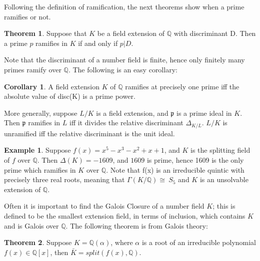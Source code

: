 \documentclass[12pt]{extarticle}
\newcommand{\Q}{\mathbb{Q}}
\newcommand{\GG}{\Gamma(K/\mathbb{Q})}
\newcommand{\spl}{split(f(x),\mathbb{Q})}
\newcommand{\<}{\langle}
\renewcommand{\>}{\rangle}
\theoremstyle{definition}
\newtheorem{theorem}{Theorem}
\newtheorem{corollary}{Corollary}
\newtheorem*{example}{Example}
\begin{document}
Following the definition of ramification, the next theorems show when a prime ramifies or not. 
\begin{theorem}
 Suppose that $K$ be a field extension of $\Q$ with discriminant D. Then a prime $p$
ramifies in $K$ if and only if $p|D$.   
\end{theorem}
Note that the discriminant of a number field is finite, hence only finitely many primes ramify over $\Q$. The following is an easy corollary:
\begin{corollary}
A field extension $K$ of $\Q$ ramifies at precisely one prime iff the absolute value of disc(K) is a prime power.
\end{corollary}
More generally, suppose $L/K$ is a field extension, and $\mathfrak{p}$ is a prime ideal in $K$. Then $\mathfrak{p}$ ramifies in $L$ iff it divides the relative discriminant $\Delta_{K/L}$. $L/K$ is unramified iff the relative discriminant is the unit ideal. 
\begin{example}
    Suppose $f(x)=  x^5 - x^3 - x^2 + x + 1$, and $K$ is the splitting field of $f$ over $\Q$. Then $\Delta(K)=-1609$, and $1609$ is prime, hence 1609 is the only prime which ramifies in $K$ over $\Q$. Note that f(x) is an irreducible quintic with precisely three real roots, meaning that $\GG \cong\ S_5$ and $K$ is an unsolvable extension of $\Q$.
\end{example}


Often it is important to find the Galois Closure of a number field $K$;  this is defined to be the smallest extension field, in terms of inclusion, which contains $K$ and is Galois over $\Q$. The following theorem is from Galois theory:
 \begin{theorem}
  Suppose $K=\Q(\alpha)$, where $\alpha$ is a root of an irreducible polynomial $f(x) \in \Q[x]$, then $\bar{K} = \spl$.
\end{theorem}
\end{document}
